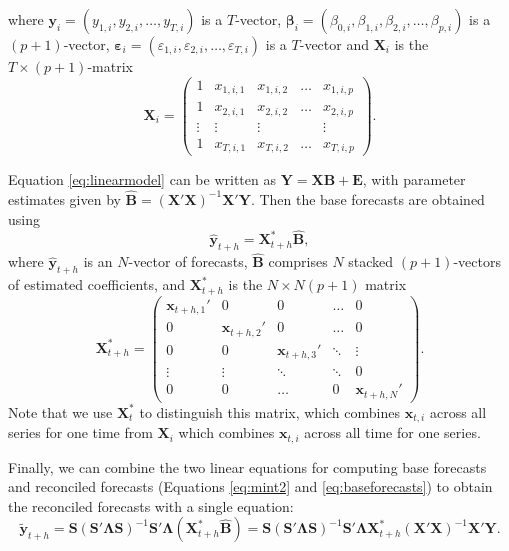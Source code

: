 \documentclass[11pt,a4paper,]{article}
\begin{document}
where \(\bm{y}_i = (y_{1,i}, y_{2,i}, \dots, y_{T,i})\) is a \(T\)-vector, \({\bm{\beta}}_i = (\beta_{0,i}, \beta_{1,i}, \beta_{2,i}, \dots, \beta_{p,i})\) is a \((p+1)\)-vector, \({\bm{\varepsilon}}_i = (\varepsilon_{1,i}, \varepsilon_{2,i}, \dots, \varepsilon_{T,i})\) is a \(T\)-vector and \(\bm{X}_i\) is the \(T\times (p+1)\)-matrix
\begin{equation}\label{eq:Xmatrixdefinition}
  \bm{X}_i = \begin{pmatrix}
  1 & x_{1,i,1} & x_{1,i,2} & \dots & x_{1,i,p}\\
  1 & x_{2,i,1} & x_{2,i,2} & \dots & x_{2,i,p}\\
  \vdots & \vdots & \vdots & & \vdots \\
  1 & x_{T,i,1} & x_{T,i,2} & \dots & x_{T,i,p}
\end{pmatrix}.
\end{equation}

Equation \eqref{eq:linearmodel} can be written as \(\bm{Y} = \bm{X} \bm{B} + \bm{E}\), with parameter estimates given by \(\hat{\bm{B}} = (\bm{X}'\bm{X})^{-1} \bm{X}'\bm{Y}\). Then the base forecasts are obtained using
\begin{equation}\label{eq:baseforecasts}
  \hat{\bm{y}}_{t+h} = \bm{X}_{t+h}^* \hat{\bm{B}},
\end{equation}
where \(\hat{\bm{y}}_{t+h}\) is an \(N\)-vector of forecasts, \(\hat{\bm{B}}\) comprises \(N\) stacked \((p+1)\)-vectors of estimated coefficients, and \(\bm{X}_{t+h}^*\) is the \(N\times N(p+1)\) matrix
\pagebreak[3]\begin{equation}
  \bm{X}_{t+h}^* =
  \begin{pmatrix}
  \bm{x}_{t+h,1}' & 0               & 0               & \dots  & 0\\
  0               & \bm{x}_{t+h,2}' & 0               & \dots  & 0\\
  0               & 0               & \bm{x}_{t+h,3}' & \ddots & \vdots \\
  \vdots          & \vdots          & \ddots          & \ddots & 0\\
  0               & 0               & \dots           & 0      & \bm{x}_{t+h,N}'
  \end{pmatrix}.
\end{equation}
Note that we use \(\bm{X}^*_{t}\) to distinguish this matrix, which combines \(\bm{x}_{t,i}\) across all series for one time from \(\bm{X}_i\) which combines \(\bm{x}_{t,i}\) across all time for one series.

Finally, we can combine the two linear equations for computing base forecasts and reconciled forecasts (Equations \eqref{eq:mint2} and \eqref{eq:baseforecasts}) to obtain the reconciled forecasts with a single equation:
\begin{equation}\label{eq:singlestep}
    \tilde{\bm{y}}_{t+h} = \bm{S}(\bm{S}'\bm{\Lambda}\bm{S})^{-1}\bm{S}'\bm{\Lambda}
                            (\bm{X}_{t+h}^* \hat{\bm{B}})
                         = \bm{S}(\bm{S}'\bm{\Lambda}\bm{S})^{-1}\bm{S}'\bm{\Lambda}
                            \bm{X}_{t+h}^* (\bm{X}'\bm{X})^{-1} \bm{X}'\bm{Y}.
\end{equation}
\end{document}
